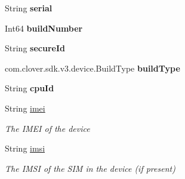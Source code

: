 \begin{DoxyCompactItemize}
\item 
\mbox{\label{classcom_1_1clover_1_1sdk_1_1v3_1_1device_1_1_device_a598dd63abe45a84f9055146e4640467c}} 
String {\bfseries serial}
\item 
\mbox{\label{classcom_1_1clover_1_1sdk_1_1v3_1_1device_1_1_device_ad81654d7d129ff8b96a42099adbbbf41}} 
Int64 {\bfseries build\+Number}
\item 
\mbox{\label{classcom_1_1clover_1_1sdk_1_1v3_1_1device_1_1_device_aab34d023b0c9b75f452df83e71d9482a}} 
String {\bfseries secure\+Id}
\item 
\mbox{\label{classcom_1_1clover_1_1sdk_1_1v3_1_1device_1_1_device_adf0001b9ed73c91f3cea9a78602a09bb}} 
com.\+clover.\+sdk.\+v3.\+device.\+Build\+Type {\bfseries build\+Type}
\item 
\mbox{\label{classcom_1_1clover_1_1sdk_1_1v3_1_1device_1_1_device_a2646eab991e7d3c82c2af497fccca723}} 
String {\bfseries cpu\+Id}
\item 
String \hyperlink{classcom_1_1clover_1_1sdk_1_1v3_1_1device_1_1_device_a4931f8c1872efdca3d12fb00007807a3}{imei}
\begin{DoxyCompactList}\small\item\em The I\+M\+EI of the device \end{DoxyCompactList}\item 
String \hyperlink{classcom_1_1clover_1_1sdk_1_1v3_1_1device_1_1_device_ab66c0e97226b4f424c2729b3f916f9a6}{imsi}
\begin{DoxyCompactList}\small\item\em The I\+M\+SI of the S\+IM in the device (if present) \end{DoxyCompactList}\item 

\end{DoxyCompactItemize}
